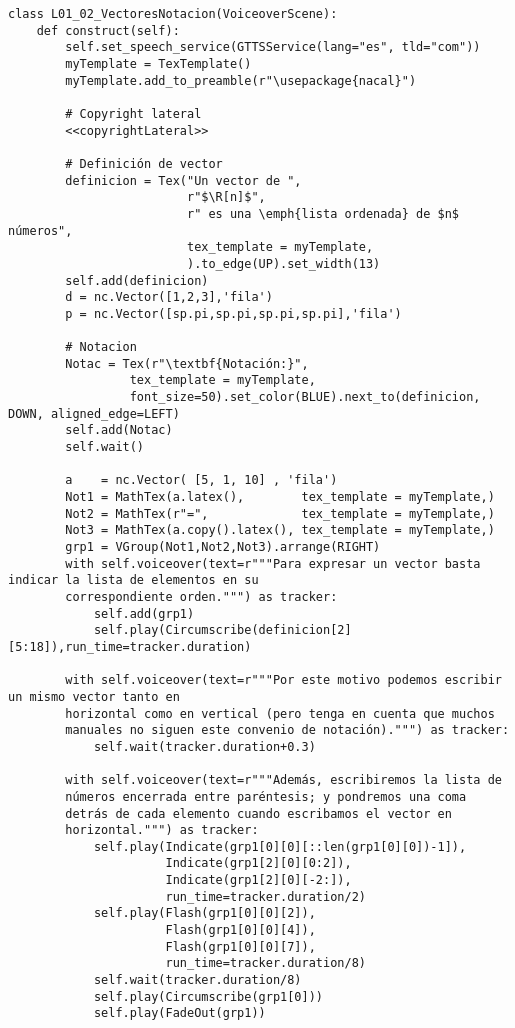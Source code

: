 \documentclass[11pt]{article}
\begin{document}
\begin{verbatim}
class L01_02_VectoresNotacion(VoiceoverScene):
    def construct(self):
        self.set_speech_service(GTTSService(lang="es", tld="com"))        
        myTemplate = TexTemplate()
        myTemplate.add_to_preamble(r"\usepackage{nacal}")
        
        # Copyright lateral
        <<copyrightLateral>>
        
        # Definición de vector
        definicion = Tex("Un vector de ",
                         r"$\R[n]$",
                         r" es una \emph{lista ordenada} de $n$ números",
                         tex_template = myTemplate,
                         ).to_edge(UP).set_width(13)
        self.add(definicion)
        d = nc.Vector([1,2,3],'fila')
        p = nc.Vector([sp.pi,sp.pi,sp.pi,sp.pi],'fila')
            
        # Notacion
        Notac = Tex(r"\textbf{Notación:}",
                 tex_template = myTemplate,
                 font_size=50).set_color(BLUE).next_to(definicion, DOWN, aligned_edge=LEFT)
        self.add(Notac)
        self.wait()

        a    = nc.Vector( [5, 1, 10] , 'fila')        
        Not1 = MathTex(a.latex(),        tex_template = myTemplate,)
        Not2 = MathTex(r"=",             tex_template = myTemplate,)
        Not3 = MathTex(a.copy().latex(), tex_template = myTemplate,)
        grp1 = VGroup(Not1,Not2,Not3).arrange(RIGHT)
        with self.voiceover(text=r"""Para expresar un vector basta indicar la lista de elementos en su
        correspondiente orden.""") as tracker:
            self.add(grp1)
            self.play(Circumscribe(definicion[2][5:18]),run_time=tracker.duration)
            
        with self.voiceover(text=r"""Por este motivo podemos escribir un mismo vector tanto en
        horizontal como en vertical (pero tenga en cuenta que muchos
        manuales no siguen este convenio de notación).""") as tracker:
            self.wait(tracker.duration+0.3)
	
        with self.voiceover(text=r"""Además, escribiremos la lista de
        números encerrada entre paréntesis; y pondremos una coma
        detrás de cada elemento cuando escribamos el vector en
        horizontal.""") as tracker:
            self.play(Indicate(grp1[0][0][::len(grp1[0][0])-1]),
                      Indicate(grp1[2][0][0:2]),
                      Indicate(grp1[2][0][-2:]),
                      run_time=tracker.duration/2)
            self.play(Flash(grp1[0][0][2]),
                      Flash(grp1[0][0][4]),
                      Flash(grp1[0][0][7]),
                      run_time=tracker.duration/8)
            self.wait(tracker.duration/8)
            self.play(Circumscribe(grp1[0]))
            self.play(FadeOut(grp1))
	

\end{verbatim}
\end{document}
